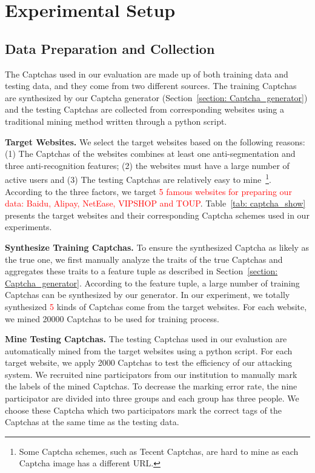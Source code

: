 \section{Experimental Setup}
\subsection{Data Preparation and Collection}
The Captchas used in our evaluation are made up of both training data and testing data, and they come from two different sources. The training Captchas are synthesized by our Captcha generator (Section~\ref{section: Captcha_generator}) and the testing Captchas are collected from corresponding websites using a traditional mining method written through a python script.

\noindent \textbf{Target Websites.} We select the target websites based on the following reasons: (1) The Captchas of the websites combines at least one anti-segmentation and three anti-recognition features; (2) the websites must have a large number of active users and (3) The testing Captchas are relatively easy to mine~\footnote{Some Captcha schemes, such as Tecent Captchas, are hard to mine as each Captcha image has a different URL.}.  According to the three factors, we target \textcolor{red}{5 famous websites for preparing our data: Baidu, Alipay, NetEase, VIPSHOP and TOUP}. Table~\ref{tab: captcha_show} presents the target websites and their corresponding Captcha schemes used in our experiments.

\noindent \textbf{Synthesize Training Captchas.} To ensure the synthesized Captcha as likely as the true one, we first manually analyze the traits of the true Captchas and aggregates these traits to a feature tuple as described in Section~\ref{section: Captcha_generator}. According to the feature tuple, a large number of training Captchas can be synthesized by our generator. In our experiment, we totally synthesized \textcolor{red}{5} kinds of Captchas come from the target websites. For each website, we mined 20000 Captchas to be used for training process.

\noindent \textbf{Mine Testing Captchas.} The testing Captchas used in our evalustion are automatically mined from the target websites using a python script. For each target website, we apply 2000 Captchas to test the efficiency of our attacking system.  We recruited nine participators from our institution to manually mark the labels of the mined Captchas. To decrease the marking error rate, the nine participator are divided into three groups and each group has three people. We choose these Captcha which two participators mark the correct tags of the Captchas at the same time as the testing data.


